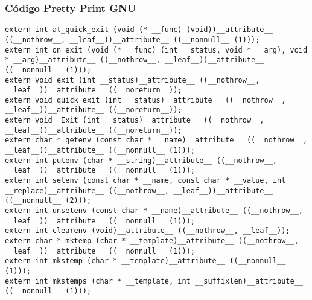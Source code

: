 \documentclass{beamer}
\begin{document}
\begin{frame}[fragile]
\frametitle{C\'odigo Pretty Print GNU}
\begin{verbatim}
extern int at_quick_exit (void (* __func) (void))__attribute__ ((__nothrow__, __leaf__))__attribute__ ((__nonnull__ (1)));
extern int on_exit (void (* __func) (int __status, void * __arg), void * __arg)__attribute__ ((__nothrow__, __leaf__))__attribute__ ((__nonnull__ (1)));
extern void exit (int __status)__attribute__ ((__nothrow__, __leaf__))__attribute__ ((__noreturn__));
extern void quick_exit (int __status)__attribute__ ((__nothrow__, __leaf__))__attribute__ ((__noreturn__));
extern void _Exit (int __status)__attribute__ ((__nothrow__, __leaf__))__attribute__ ((__noreturn__));
extern char * getenv (const char * __name)__attribute__ ((__nothrow__, __leaf__))__attribute__ ((__nonnull__ (1)));
extern int putenv (char * __string)__attribute__ ((__nothrow__, __leaf__))__attribute__ ((__nonnull__ (1)));
extern int setenv (const char * __name, const char * __value, int __replace)__attribute__ ((__nothrow__, __leaf__))__attribute__ ((__nonnull__ (2)));
extern int unsetenv (const char * __name)__attribute__ ((__nothrow__, __leaf__))__attribute__ ((__nonnull__ (1)));
extern int clearenv (void)__attribute__ ((__nothrow__, __leaf__));
extern char * mktemp (char * __template)__attribute__ ((__nothrow__, __leaf__))__attribute__ ((__nonnull__ (1)));
extern int mkstemp (char * __template)__attribute__ ((__nonnull__ (1)));
extern int mkstemps (char * __template, int __suffixlen)__attribute__ ((__nonnull__ (1)));
\end{verbatim}
\end{frame}
\end{document}
